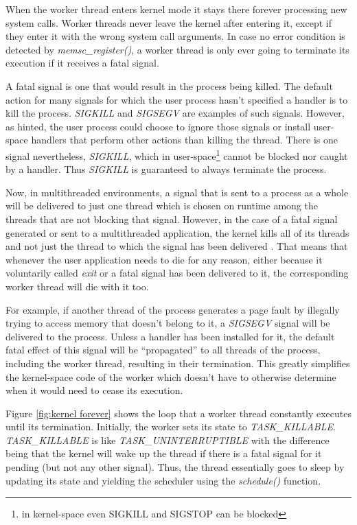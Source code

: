 When the worker thread enters kernel mode it stays there forever processing new
system calls. Worker threads never leave the kernel after entering it, except
if they enter it with the wrong system call arguments. In case no error
condition is detected by \emph{memsc\_register()}, a worker thread is only ever
going to terminate its execution if it receives a fatal signal.

A fatal signal is one that would result in the process being killed.  The
default action for many signals for which the user process hasn't specified a
handler is to kill the process. \emph{SIGKILL} and \emph{SIGSEGV} are examples
of such signals. However, as hinted, the user process could choose to ignore
those signals or install user-space handlers that perform other actions than
killing the thread. There is one signal nevertheless, \emph{SIGKILL}, which in
user-space\footnote{in kernel-space even SIGKILL and SIGSTOP can be blocked}
cannot be blocked nor caught by a handler.  Thus \emph{SIGKILL} is guaranteed
to always terminate the process.

Now, in multithreaded environments, a signal that is sent to a process as a
whole will be delivered to just one thread which is chosen on runtime among the
threads that are not blocking that signal. However, in the case of a fatal
signal generated or sent to a multithreaded application, the kernel kills all
of its threads and not just the thread to which the signal has been delivered
\cite{bovet}. That means that whenever the user application needs to die for
any reason, either because it voluntarily called \emph{exit} or a fatal signal
has been delivered to it, the corresponding \memsc worker thread will die with
it too.

For example, if another thread of the process generates a page fault by
illegally trying to access memory that doesn't belong to it, a \emph{SIGSEGV}
signal will be delivered to the process. Unless a handler has been installed
for it, the default fatal effect of this signal will be ``propagated'' to all
threads of the process, including the \memsc worker thread, resulting in their
termination. This greatly simplifies the kernel-space code of the worker which
doesn't have to otherwise determine when it would need to cease its execution.

Figure \ref{fig:kernel forever} shows the loop that a \memsc worker thread
constantly executes until its termination. Initially, the worker sets its state
to \emph{TASK\_KILLABLE}. \emph{TASK\_KILLABLE} is like
\emph{TASK\_UNINTERRUPTIBLE} with the difference being that the kernel will
wake up the thread if there is a fatal signal for it pending (but not any other
signal). Thus, the thread essentially goes to sleep by updating its state and
yielding the scheduler using the \emph{schedule()} function.

